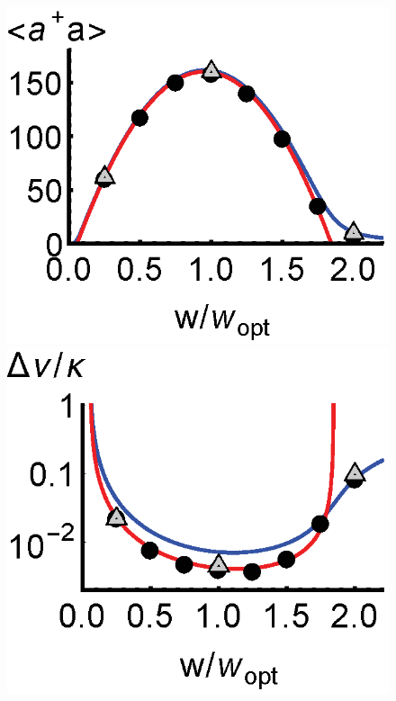 \documentclass[aps,
twocolumn,
superscriptaddress,groupedaddress]{revtex4}
\begin{document}
\begin{figure}
\begin{center}
	\hspace{-5.0mm} \includegraphics[scale =0.38] {N40Laserada.eps}
	\hspace{-5.0mm} \includegraphics[scale =0.38] {N40LaserLW.eps}

\end{center}
\end{figure}
\end{document}
